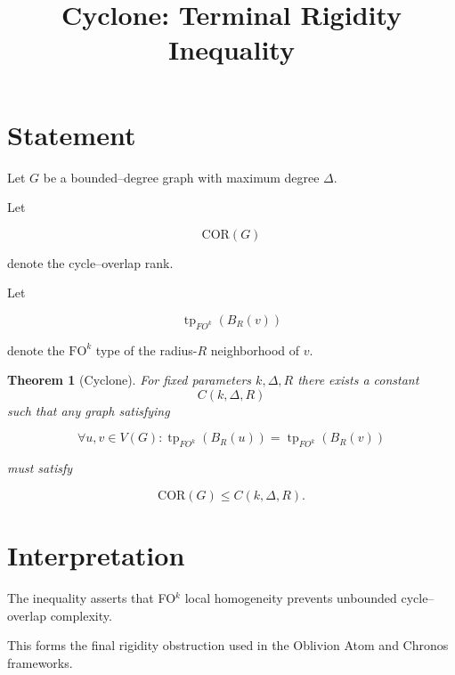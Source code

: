 \documentclass[11pt]{article}
\title{Cyclone: Terminal Rigidity Inequality}
\date{}
\newtheorem{theorem}{Theorem}
\begin{document}
\maketitle

\section*{Statement}

Let $G$ be a bounded–degree graph with maximum degree $\Delta$.

Let

\[
\mathrm{COR}(G)
\]

denote the cycle–overlap rank.

Let

\[
\operatorname{tp}_{FO^k}(B_R(v))
\]

denote the $\mathrm{FO}^k$ type of the radius-$R$ neighborhood of $v$.

\begin{theorem}[Cyclone]
For fixed parameters $k,\Delta,R$ there exists a constant
\[
C(k,\Delta,R)
\]
such that any graph satisfying

\[
\forall u,v \in V(G):
\operatorname{tp}_{FO^k}(B_R(u))=
\operatorname{tp}_{FO^k}(B_R(v))
\]

must satisfy

\[
\mathrm{COR}(G)\le C(k,\Delta,R).
\]

\end{theorem}

\section*{Interpretation}

The inequality asserts that FO$^k$ local homogeneity prevents
unbounded cycle–overlap complexity.

This forms the final rigidity obstruction used in the
Oblivion Atom and Chronos frameworks.
\end{document}
